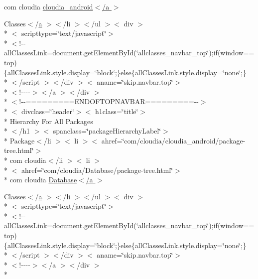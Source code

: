 \begin{DoxyCompactItemize}
 com cloudia \hyperlink{overview-tree_8html_a23f2c691db59175f646767a6ce091103}{cloudia\-\_\-android$<$/a $>$}
\item 
Classes$<$/\hyperlink{style_8css_a5e8981582017bb8b84c21f148345d1f7}{a} $>$$<$/li $>$$<$/ul $>$$<$ div $>$\\*
$<$ scripttype=\char`\"{}text/javascript\char`\"{}$>$\\*
$<$!-\/-\/all\-Classes\-Link=document.\-get\-Element\-By\-Id(\char`\"{}allclasses\-\_\-navbar\-\_\-top\char`\"{});if(window==top)\{all\-Classes\-Link.\-style.\-display=\char`\"{}block\char`\"{};\}else\{all\-Classes\-Link.\-style.\-display=\char`\"{}none\char`\"{};\}\\*
$<$/script $>$$<$/div $>$$<$ aname=\char`\"{}skip.\-navbar.\-top\char`\"{}$>$\\*
$<$!-\/-\/-\/-\/$>$$<$/a $>$$<$/div $>$\\*
$<$!-\/-\/=========E\-N\-D\-O\-F\-T\-O\-P\-N\-A\-V\-B\-A\-R=========-\/-\/$>$\\*
$<$ divclass=\char`\"{}header\char`\"{}$>$$<$ h1class=\char`\"{}title\char`\"{}$>$\\*
 Hierarchy For All Packages\\*
$<$/h1 $>$$<$ spanclass=\char`\"{}package\-Hierarchy\-Label\char`\"{}$>$\\*
 Package$<$/li $>$$<$ li $>$$<$ ahref=\char`\"{}com/cloudia/cloudia\-\_\-android/package-\/tree.\-html\char`\"{}$>$\\*
 com cloudia$<$/li $>$$<$ li $>$\\*
$<$ ahref=\char`\"{}com/cloudia/Database/package-\/tree.\-html\char`\"{}$>$\\*
 com cloudia \hyperlink{overview-tree_8html_a3877c85b468efd80aba5bff279eb7556}{Database$<$/a $>$}
\item 
Classes$<$/\hyperlink{style_8css_a5e8981582017bb8b84c21f148345d1f7}{a} $>$$<$/li $>$$<$/ul $>$$<$ div $>$\\*
$<$ scripttype=\char`\"{}text/javascript\char`\"{}$>$\\*
$<$!-\/-\/all\-Classes\-Link=document.\-get\-Element\-By\-Id(\char`\"{}allclasses\-\_\-navbar\-\_\-top\char`\"{});if(window==top)\{all\-Classes\-Link.\-style.\-display=\char`\"{}block\char`\"{};\}else\{all\-Classes\-Link.\-style.\-display=\char`\"{}none\char`\"{};\}\\*
$<$/script $>$$<$/div $>$$<$ aname=\char`\"{}skip.\-navbar.\-top\char`\"{}$>$\\*
$<$!-\/-\/-\/-\/$>$$<$/a $>$$<$/div $>$\\*
$$
\end{DoxyCompactItemize}
